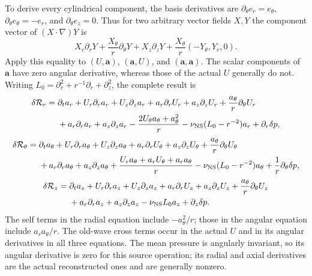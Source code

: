 To derive every cylindrical component, the basis derivatives are
\(\partial_\theta e_r=e_\theta\),
\(\partial_\theta e_\theta=-e_r\), and
\(\partial_\theta e_z=0\). Thus for two arbitrary vector fields
\(X,Y\) the component vector of \((X\cdot\nabla)Y\) is
\[
 X_r\partial_rY+\frac{X_\theta}{r}\partial_\theta Y
 +X_z\partial_zY+\frac{X_\theta}{r}(-Y_\theta,Y_r,0).
\]
Apply this equality to \((U,\boldsymbol a)\),
\((\boldsymbol a,U)\), and \((\boldsymbol a,\boldsymbol a)\).
The scalar components of \(\boldsymbol a\) have zero angular
derivative, whereas those of the actual \(U\) generally do not.
Writing \(L_0=\partial_r^2+r^{-1}\partial_r+\partial_z^2\), the
complete result is
\begin{equation}\label{mcmean:force_r}
\begin{split}
 \delta\mathcal R_r={}&\partial_ta_r+U_r\partial_ra_r+U_z\partial_za_r
       +a_r\partial_rU_r+a_z\partial_zU_r
       +\frac{a_\theta}{r}\partial_\theta U_r\\
 &+a_r\partial_ra_r+a_z\partial_za_r
       -\frac{2U_\theta a_\theta+a_\theta^2}{r}
       -\nu_{\rm NS}(L_0-r^{-2})a_r+\partial_r\delta p,
\end{split}
\end{equation}
\begin{equation}\label{mcmean:force_theta}
\begin{split}
 \delta\mathcal R_\theta={}&\partial_ta_\theta
       +U_r\partial_ra_\theta+U_z\partial_za_\theta
       +a_r\partial_rU_\theta+a_z\partial_zU_\theta
       +\frac{a_\theta}{r}\partial_\theta U_\theta\\
 &+a_r\partial_ra_\theta+a_z\partial_za_\theta
       +\frac{U_ra_\theta+a_rU_\theta+a_ra_\theta}{r}
       -\nu_{\rm NS}(L_0-r^{-2})a_\theta
       +\frac1r\partial_\theta\delta p,
\end{split}
\end{equation}
\begin{equation}\label{mcmean:force_z}
\begin{split}
 \delta\mathcal R_z={}&\partial_ta_z+U_r\partial_ra_z+U_z\partial_za_z
       +a_r\partial_rU_z+a_z\partial_zU_z
       +\frac{a_\theta}{r}\partial_\theta U_z\\
 &+a_r\partial_ra_z+a_z\partial_za_z
       -\nu_{\rm NS}L_0a_z+\partial_z\delta p.
\end{split}
\end{equation}
The self terms in the radial equation include
\(-a_\theta^2/r\); those in the angular equation include
\(a_ra_\theta/r\). The old-wave cross terms occur in the actual
\(U\) and in its angular derivatives in all three equations.
The mean pressure is angularly invariant, so its angular derivative
is zero for this source operation; its radial and axial derivatives
are the actual reconstructed ones and are generally nonzero.

